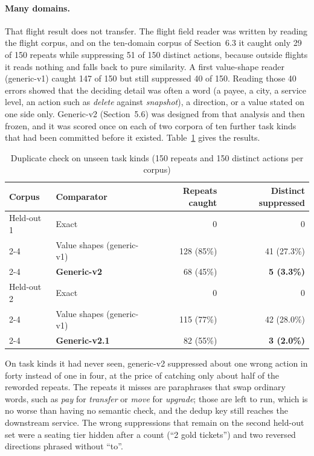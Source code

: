 \paragraph{Many domains.} That flight result does not transfer. The flight
field reader was written by reading the flight corpus, and on the
ten-domain corpus of Section~6.3 it caught only 29 of 150 repeats while
suppressing 51 of 150 distinct actions, because outside flights it reads
nothing and falls back to pure similarity. A first value-shape reader
(generic-v1) caught 147 of 150 but still suppressed 40 of 150. Reading those
40 errors showed that the deciding detail was often a word (a payee, a city,
a service level, an action such as \emph{delete} against \emph{snapshot}), a
direction, or a value stated on one side only. Generic-v2
(Section~5.6) was designed from that analysis and then frozen, and it was
scored once on each of two corpora of ten further task kinds that had been
committed before it existed. Table~\ref{tab:semantic} gives the results.

\begin{table}[htbp]
  \centering
  \caption{Duplicate check on unseen task kinds (150 repeats and 150
    distinct actions per corpus)}
  \label{tab:semantic}
  \small
  \begin{tabular}{|l|l|r|r|}
    \hline
    \textbf{Corpus} & \textbf{Comparator} & \textbf{Repeats caught} &
      \textbf{Distinct suppressed} \\
    \hline
    Held-out 1 & Exact & 0 & 0 \\
    \cline{2-4}
     & Value shapes (generic-v1) & 128 (85\%) & 41 (27.3\%) \\
    \cline{2-4}
     & \textbf{Generic-v2} & 68 (45\%) & \textbf{5 (3.3\%)} \\
    \hline
    Held-out 2 & Exact & 0 & 0 \\
    \cline{2-4}
     & Value shapes (generic-v1) & 115 (77\%) & 42 (28.0\%) \\
    \cline{2-4}
     & \textbf{Generic-v2.1} & 82 (55\%) & \textbf{3 (2.0\%)} \\
    \hline
  \end{tabular}
\end{table}

On task kinds it had never seen, generic-v2 suppressed about one wrong
action in forty instead of one in four, at the price of catching only about
half of the reworded repeats. The repeats it misses are paraphrases that
swap ordinary words, such as \emph{pay} for \emph{transfer} or \emph{move}
for \emph{upgrade}; those are left to run, which is no worse than having no
semantic check, and the dedup key still reaches the downstream service. The
wrong suppressions that remain on the second held-out set were a seating
tier hidden after a count (``2 gold tickets'') and two reversed directions
phrased without ``to''.

